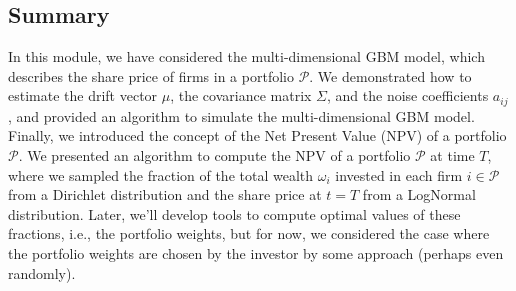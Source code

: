 \documentclass[11pt]{article}
\theoremstyle{definition}
\begin{document}
\subsection{Summary}
In this module, we have considered the multi-dimensional GBM model, 
which describes the share price of firms in a portfolio $\mathcal{P}$.
We demonstrated how to estimate the drift vector $\mu$, the covariance matrix $\Sigma$, and the noise coefficients $a_{ij}$, and provided an algorithm to simulate the multi-dimensional GBM model. Finally, we introduced the concept of the Net Present Value (NPV) of a portfolio $\mathcal{P}$. We presented an algorithm to compute the NPV of a portfolio $\mathcal{P}$ at time $T$, 
where we sampled the fraction of the total wealth $\omega_{i}$ invested in each firm $i\in\mathcal{P}$ from a Dirichlet distribution and the share price at $t=T$ from a LogNormal distribution. Later, we'll develop tools to compute optimal values of these fractions, i.e., the portfolio weights, but for now, we considered the case where the portfolio weights are chosen by the investor by some approach (perhaps even randomly).



\clearpage
\printindex
\end{document}
